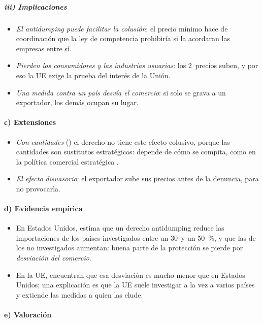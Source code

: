 \documentclass[11pt]{article}
\begin{document}
\subparagraph{iii) Implicaciones}

\begin{itemize}
\item \emph{El antidumping puede facilitar la colusión}: el precio mínimo hace de coordinación que la ley de competencia prohibiría si la acordaran las empresas entre sí.
\item \emph{Pierden los consumidores y las industrias usuarias}: los 2~precios suben, y por eso la UE exige la prueba del interés de la Unión.
\item \emph{Una medida contra un país desvía el comercio}: si solo se grava a un exportador, los demás ocupan su lugar.
\end{itemize}

\paragraph{c) Extensiones}

\begin{itemize}
\item \emph{Con cantidades} () el derecho no tiene este efecto colusivo, porque las cantidades son sustitutos estratégicos: depende de cómo se compita, como en la política comercial estratégica .
\item \emph{El efecto disuasorio}: el exportador sube sus precios antes de la denuncia, para no provocarla.
\end{itemize}

\paragraph{d) Evidencia empírica}

\begin{itemize}
\item En Estados Unidos, \textcite{Prusa2001Spread} estima que un derecho antidumping reduce las importaciones de los países investigados entre un 30~y un 50~\%, y que las de los no investigados aumentan: buena parte de la protección se pierde por \emph{desviación del comercio}.
\item En la UE, \textcite{KoningsVandenbussche2001Diversion} encuentran que esa desviación es mucho menor que en Estados Unidos; una explicación es que la UE suele investigar a la vez a varios países y extiende las medidas a quien las elude.
\end{itemize}

\paragraph{e) Valoración}
\end{document}
